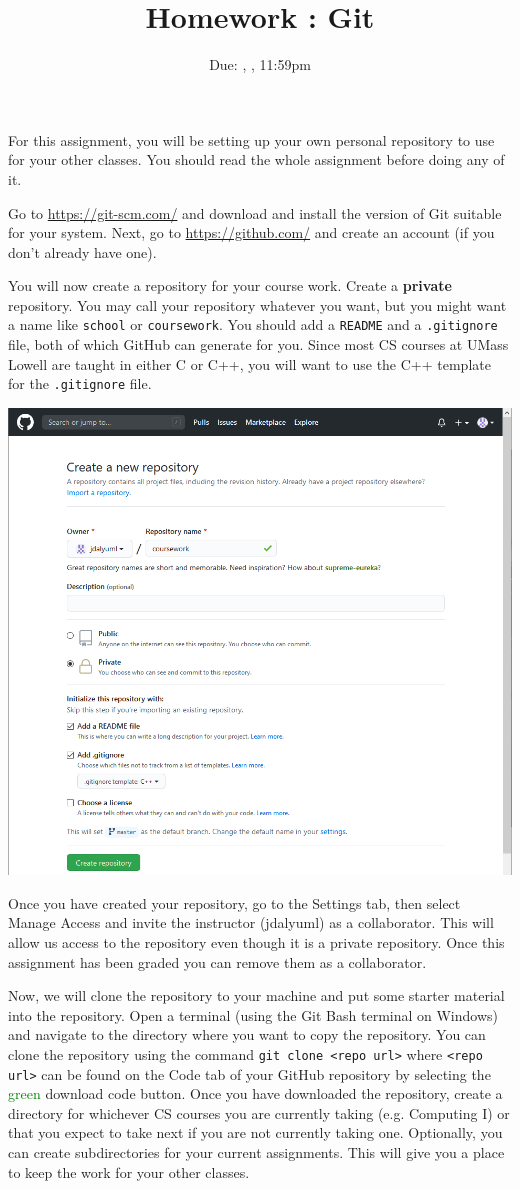 \documentclass[12pt]{article}
\title{Homework \hwno: Git}
\date{Due: \dayofweekname{\duedate}{\duemonth}{\year}, \monthname[\duemonth] \duedate, 11:59pm}
\newcommand{\code}[1]{\texttt{#1}}
\begin{document}
\maketitle

For this assignment, you will be setting up your own personal repository to use for your other classes.  You should read the whole assignment before doing any of it.

Go to \url{https://git-scm.com/} and download and install the version of Git suitable for your system.
Next, go to \url{https://github.com/} and create an account (if you don't already have one).

You will now create a repository for your course work.
Create a \textbf{private} repository.
You may call your repository whatever you want, but you might want a name like \code{school} or \code{coursework}.
You should add a \code{README} and a \code{.gitignore} file, both of which GitHub can generate for you.
Since most CS courses at UMass Lowell are taught in either C or C++, you will want to use the C++ template for the \code{.gitignore} file.

\includegraphics[width=0.7\columnwidth]{newrepo}

Once you have created your repository, go to the Settings tab, then select Manage Access and invite the instructor (jdalyuml) as a collaborator.
This will allow us access to the repository even though it is a private repository.
Once this assignment has been graded you can remove them as a collaborator.

Now, we will clone the repository to your machine and put some starter material into the repository.
Open a terminal (using the Git Bash terminal on Windows) and navigate to the directory where you want to copy the repository.
You can clone the repository using the command \code{git clone <repo url>} where \code{<repo url>} can be found on the Code tab of your GitHub repository by selecting the \textcolor{green}{green} download code button.
Once you have downloaded the repository, create a directory for whichever CS courses you are currently taking (e.g. Computing I) or that you expect to take next if you are not currently taking one.
Optionally, you can create subdirectories for your current assignments.
This will give you a place to keep the work for your other classes.
\end{document}
